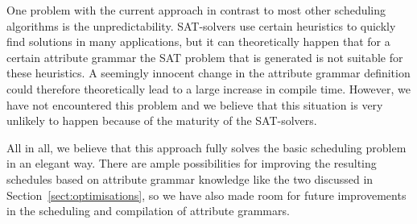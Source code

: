 \documentclass{llncs}
\newcommand{\sectref}[1]{Section~\ref{#1}}
\DeclareRobustCommand{\VAN}[3]{#2}
\begin{document}
One problem with the current approach in contrast to most other scheduling algorithms is the unpredictability. SAT-solvers use certain heuristics to quickly find solutions in many applications, but it can theoretically happen that for a certain attribute grammar the SAT problem that is generated is not suitable for these heuristics. A seemingly innocent change in the attribute grammar definition could therefore theoretically lead to a large increase in compile time. However, we have not encountered this problem and we believe that this situation is very unlikely to happen because of the maturity of the SAT-solvers.

All in all, we believe that this approach fully solves the basic scheduling problem in an elegant way. There are ample possibilities for improving the resulting schedules based on attribute grammar knowledge like the two discussed in \sectref{sect:optimisations}, so we have also made room for future improvements in the scheduling and compilation of attribute grammars.

\DeclareRobustCommand{\VAN}[3]{#3}


\end{document}
